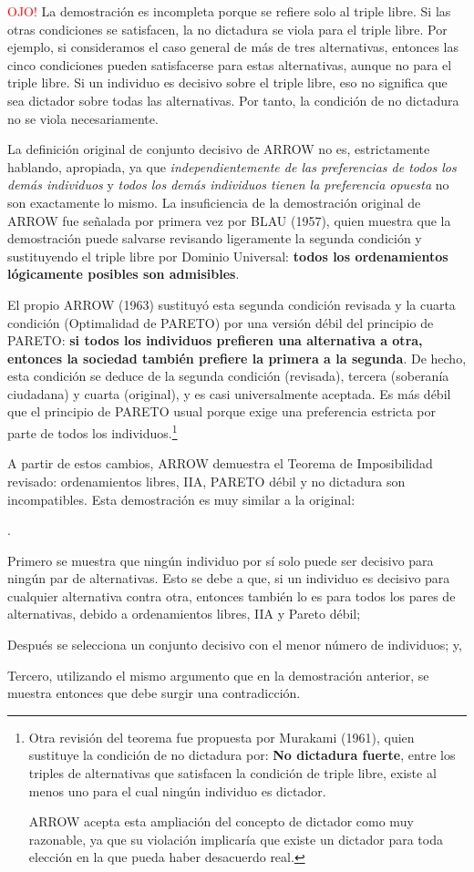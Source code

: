 \documentclass[10pt,a4paper]{article}
\newcounter{numitem}
\newenvironment{lnum}
      {\begin{list}{\arabic{numitem}.}{%
          \usecounter{numitem}%
          \setlength{\leftmargin}{1cm}%
          \setlength{\parskip}{3pt}%
          \setlength{\itemsep}{0pt}%
          \setlength{\parsep}{0pt}%
      }}
      {\end{list}}
\begin{document}
\textcolor{red}{OJO!} La demostración es incompleta porque se refiere solo al triple libre. Si las otras condiciones se satisfacen, la no dictadura se viola para el triple libre. Por ejemplo, si consideramos el caso general de más de tres alternativas, entonces las cinco condiciones pueden satisfacerse para estas alternativas, aunque no para el triple libre. Si un individuo es decisivo sobre el triple libre, eso no significa que sea dictador sobre todas las alternativas. Por tanto, la condición de no dictadura no se viola necesariamente.

La definición original de conjunto decisivo de ARROW no es, estrictamente hablando, apropiada, ya que \textit{independientemente de las preferencias de todos los demás individuos} y \textit{todos los demás individuos tienen la preferencia opuesta} no son exactamente lo mismo. La insuficiencia de la demostración original de ARROW fue señalada por primera vez por BLAU (1957), quien muestra que la demostración puede salvarse revisando ligeramente la segunda condición y sustituyendo el triple libre por Dominio Universal: \textbf{todos los ordenamientos lógicamente posibles son admisibles}.

El propio ARROW (1963) sustituyó esta segunda condición revisada y la cuarta condición (Optimalidad de PARETO) por una versión débil del principio de PARETO: \textbf{si todos los individuos prefieren una alternativa a otra, entonces la sociedad también prefiere la primera a la segunda}. De hecho, esta condición se deduce de la segunda condición (revisada), tercera (soberanía ciudadana) y cuarta (original), y es casi universalmente aceptada. Es más débil que el principio de PARETO usual porque exige una preferencia estricta por parte de todos los individuos.\footnote{%
    Otra revisión del teorema fue propuesta por Murakami (1961), quien sustituye la condición de no dictadura por: \textbf{No dictadura fuerte}, entre los triples de alternativas que satisfacen la condición de triple libre, existe al menos uno para el cual ningún individuo es dictador.

ARROW acepta esta ampliación del concepto de dictador como muy razonable, ya que su violación implicaría que existe un dictador para toda elección en la que pueda haber desacuerdo real.
}

A partir de estos cambios, ARROW demuestra el Teorema de Imposibilidad revisado: ordenamientos libres, IIA, PARETO débil y no dictadura son incompatibles. Esta demostración es muy similar a la original:
\begin{lnum}
    \item Primero se muestra que ningún individuo por sí solo puede ser decisivo para ningún par de alternativas. Esto se debe a que, si un individuo es decisivo para cualquier alternativa contra otra, entonces también lo es para todos los pares de alternativas, debido a ordenamientos libres, IIA y Pareto débil;
    \item Después se selecciona un conjunto decisivo con el menor número de individuos; y,
    \item Tercero, utilizando el mismo argumento que en la demostración anterior, se muestra entonces que debe surgir una contradicción.
\end{lnum}
\end{document}
